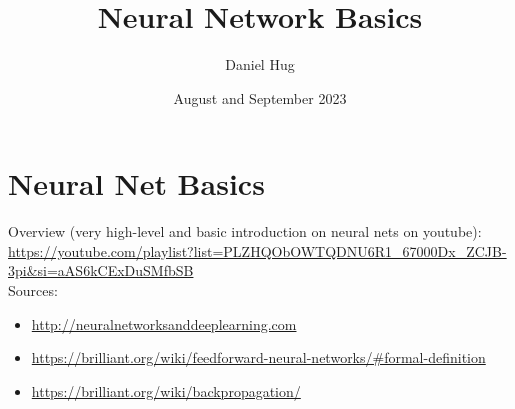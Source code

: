 \documentclass[12pt,oneside,a4paper]{article}
\title{Neural Network Basics}
\author{Daniel Hug}
\date{August and September 2023}
\begin{document}
\maketitle

\setlength{\parindent}{0pt}

\section{Neural Net Basics}

Overview (very high-level and basic introduction on neural nets on youtube):\\
\scriptsize
\url{https://youtube.com/playlist?list=PLZHQObOWTQDNU6R1_67000Dx_ZCJB-3pi&si=aAS6kCExDuSMfbSB}
\normalsize\\

Sources:
\scriptsize
\begin{itemize}
    \item \url{http://neuralnetworksanddeeplearning.com}
    \item \url{https://brilliant.org/wiki/feedforward-neural-networks/\#formal-definition}
    \item \url{https://brilliant.org/wiki/backpropagation/}
\end{itemize}
\normalsize


\newpage



\end{document}
